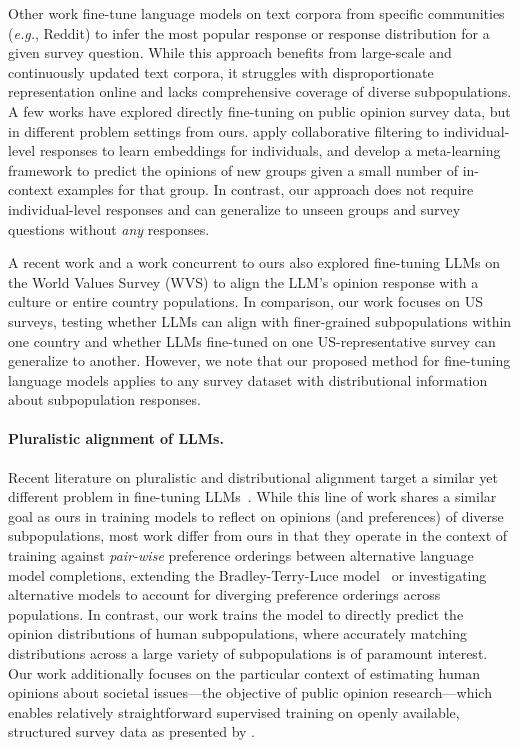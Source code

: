 Other work \cite{chu2023language, he2024community,feng-etal-2024-modular} fine-tune language models on text corpora from specific communities (\textit{e.g.}, Reddit) to infer the most popular response or response distribution for a given survey question. 
While this approach benefits from large-scale and continuously updated text corpora, it struggles with disproportionate representation online and lacks comprehensive coverage of diverse subpopulations. 
A few works have explored directly fine-tuning on public opinion survey data, but in different problem settings from ours.
\citet{li2023steerability} apply collaborative filtering to individual-level responses to learn embeddings for individuals, and 
\citet{zhao2023group} develop a meta-learning framework to predict the opinions of new groups given a small number of in-context examples for that group.
In contrast, our approach does not require individual-level responses and can generalize to unseen groups and survey questions without \textit{any} responses.

A recent work \cite{li2024culturellm} and a work concurrent to ours \cite{cao2025specializing} also explored fine-tuning LLMs on the World Values Survey (WVS) to align the LLM's opinion response with a culture or entire country populations.
In comparison, our work focuses on US surveys, testing whether LLMs can align with finer-grained subpopulations within one country and whether LLMs fine-tuned on one US-representative survey can generalize to another.
However, we note that our proposed method for fine-tuning language models applies to any survey dataset with distributional information about subpopulation responses.

\vspace{-5pt}
\paragraph{Pluralistic alignment of LLMs.}
Recent literature on pluralistic and distributional alignment target a similar yet different problem in fine-tuning LLMs~\cite{chakrabortymaxmin,melnyk2024distributional,poddar2024personalizing,siththaranjan2023distributional,yao2024no,sorensen2024roadmap,lake2024distributional,chen2024pal,jiang2024can}.
While this line of work shares a similar goal as ours in training models to reflect on opinions (and preferences) of diverse subpopulations, most work differ from ours in that they operate in the context of training against \textit{pair-wise} preference orderings between alternative language model completions, extending the Bradley-Terry-Luce model~\cite{rajkumar2014statistical, ouyang2022training, rafailov2024direct} or investigating alternative models to account for diverging preference orderings across populations.
In contrast, our work trains the model to directly predict the opinion distributions of human subpopulations, where accurately matching distributions across a large variety of subpopulations is of paramount interest.
Our work additionally focuses on the particular context of estimating human opinions about societal issues---the objective of public opinion research---which enables relatively straightforward supervised training on openly available, structured survey data as presented by \OURDATA.